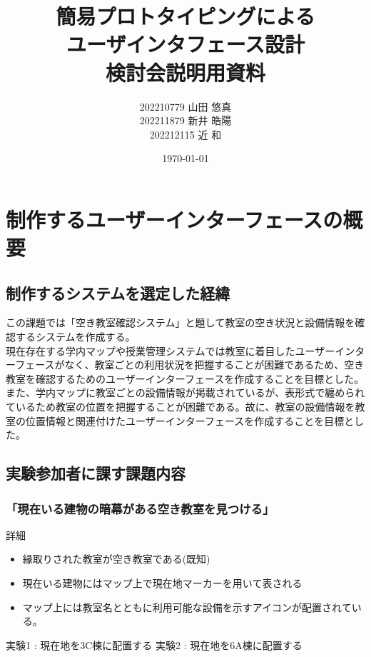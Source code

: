 \documentclass[12pt,a4paper,dvipdf]{jsarticle}
\title{簡易プロトタイピングによる\\ユーザインタフェース設計\\検討会説明用資料}
\author{202210779 山田 悠真\\202211879 新井 皓陽\\202212115 近 和}
\date{\today}
\begin{document}
\maketitle
\newpage


\section{制作するユーザーインターフェースの概要}
\subsection{制作するシステムを選定した経緯}
この課題では「空き教室確認システム」と題して教室の空き状況と設備情報を確認するシステムを作成する。\\
現在存在する学内マップや授業管理システムでは教室に着目したユーザーインターフェースがなく、教室ごとの利用状況を把握することが困難であるため、空き教室を確認するためのユーザーインターフェースを作成することを目標とした。また、学内マップに教室ごとの設備情報が掲載されているが、表形式で纏められているため教室の位置を把握することが困難である。故に、教室の設備情報を教室の位置情報と関連付けたユーザーインターフェースを作成することを目標とした。
\subsection{実験参加者に課す課題内容}
\subsubsection{「現在いる建物の暗幕がある空き教室を見つける」}
詳細
\begin{itemize}
    \item 縁取りされた教室が空き教室である(既知)
    \item 現在いる建物にはマップ上で現在地マーカーを用いて表される
    \item マップ上には教室名とともに利用可能な設備を示すアイコンが配置されている。
\end{itemize}
実験1 : 現在地を3C棟に配置する
実験2 : 現在地を6A棟に配置する
\end{document}
